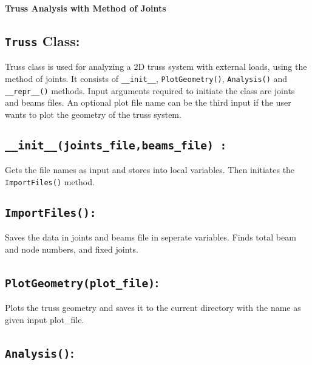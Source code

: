 \documentclass[10pt]{article}
\begin{document}
\begin{center}
    \large \textbf{Truss Analysis with Method of Joints}
\end{center}

\subsection*{\texttt{Truss} Class:}

Truss class is used for analyzing a 2D truss system with external loads, using the method of joints. It consists of \texttt{\_\_init\_\_}, \texttt{PlotGeometry()}, \texttt{Analysis()} and \texttt{\_\_repr\_\_()} methods. Input arguments required to initiate the class are joints and beams files. An optional plot file name can be the third input if the user wants to plot the geometry of the truss system.

\subsection*{\texttt{\_\_init\_\_(joints\_file,beams\_file) :}}
Gets the file names as input and stores into local variables. Then initiates the \texttt{ImportFiles()} method.

\subsection*{\texttt{ImportFiles():}}

Saves the data in joints and beams file in seperate variables.
Finds total beam and node numbers, and fixed joints.

\subsection*{\texttt{PlotGeometry(plot\_file)}:}

Plots the truss geometry and saves it to the current directory
with the name as given input plot\_file.

\subsection*{\texttt{Analysis()}:}
\end{document}
